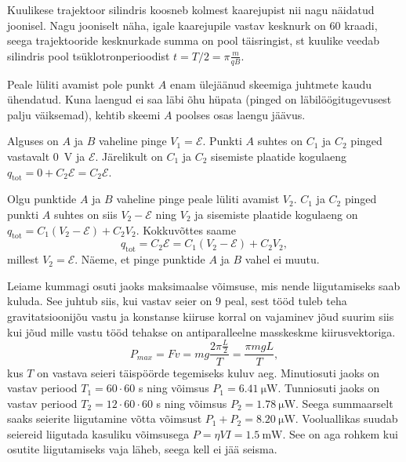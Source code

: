 \documentclass[10pt]{article}
\begin{document}
Kuulikese trajektoor silindris koosneb kolmest kaarejupist nii nagu näidatud joonisel. Nagu jooniselt näha, igale kaarejupile vastav kesknurk on 60 kraadi, seega trajektooride kesknurkade summa on pool täisringist, st kuulike veedab silindris pool tsüklotronperioodist  $t=T/2=\pi\frac m{qB}$.
\probend
\bigskip


\solu
Peale lüliti avamist pole punkt $A$ enam ülejäänud skeemiga juhtmete kaudu ühendatud. Kuna laengud ei saa läbi õhu hüpata (pinged on läbilöögitugevusest palju väiksemad), kehtib skeemi $A$ poolses osas laengu jäävus.

Alguses on $A$ ja $B$ vaheline pinge $V_1 = \mathcal E$. Punkti $A$ suhtes on $C_1$ ja $C_2$ pinged vastavalt \SI{0}{V} ja $\mathcal E$. Järelikult on $C_1$ ja $C_2$ sisemiste plaatide kogulaeng $q_\mathrm{tot} = 0 + C_2\mathcal E = C_2\mathcal E$.

Olgu punktide $A$ ja $B$ vaheline pinge peale lüliti avamist $V_2$. $C_1$ ja $C_2$ pinged punkti $A$ suhtes on siis $V_2 - \mathcal E$ ning $V_2$ ja sisemiste plaatide kogulaeng on $q_\mathrm{tot} = C_1(V_2 - \mathcal E) + C_2V_2$. Kokkuvõttes saame
\[
q_\mathrm{tot} = C_2\mathcal E = C_1(V_2 - \mathcal E) + C_2V_2,
\]
millest $V_2=\mathcal E$. Näeme, et pinge punktide $A$ ja $B$ vahel ei muutu.
\probend
\bigskip

\setAuthor{}

\solu
Leiame kummagi osuti jaoks maksimaalse võimsuse, mis nende liigutamiseks saab
kuluda. See juhtub siis, kui vastav seier on $9$ peal, sest tööd tuleb teha
gravitatsioonijõu vastu ja konstanse kiiruse korral on vajaminev jõud suurim
siis kui jõud mille vastu tööd tehakse on antiparalleelne masskeskme
kiirusvektoriga.
$$P_{max} = F v = mg \frac{2 \pi \frac{L}{2}}{T} = \frac{\pi mgL}{T},$$
kus $T$ on vastava seieri täispöörde tegemiseks kuluv aeg.
Minutiosuti jaoks on vastav periood $T_1={60\cdot60}$ s ning võimsus $P_1 =\SI{6.41}{\micro\watt}$.
Tunniosuti jaoks on vastav periood $T_2={12\cdot 60\cdot60}$ s ning võimsus $P_2=\SI{1.78}{\micro\watt}$. Seega summaarselt saaks
seierite liigutamine võtta võimsust $P_1+P_2 = \SI {8.20}{\micro\watt}$.
Vooluallikas suudab seiereid liigutada kasuliku võimsusega
$P=\eta VI=\SI{1.5}{\milli\watt}$. See on aga rohkem kui osutite liigutamiseks
vaja läheb, seega kell ei jää seisma.
\end{document}
